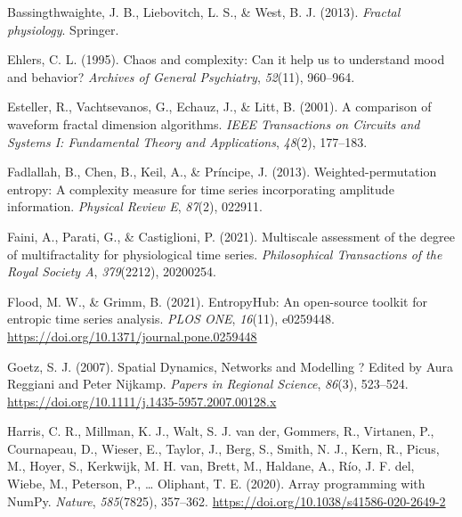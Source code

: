 \documentclass[
  man]{apa6}
\newlength{\cslhangindent}
\newlength{\cslentryspacingunit} %
\newenvironment{CSLReferences}[2] %
 {%
  \setlength{\parindent}{0pt}
  \ifodd #1
  \let\oldpar\par
  \def\par{\hangindent=\cslhangindent\oldpar}
  \fi
  \setlength{\parskip}{#2\cslentryspacingunit}
 }%
 {}
\begin{document}
\hypertarget{refs}{}
\begin{CSLReferences}{1}{0}
\leavevmode{}%
Bassingthwaighte, J. B., Liebovitch, L. S., \& West, B. J. (2013). \emph{Fractal physiology}. Springer.

\leavevmode{}%
Ehlers, C. L. (1995). Chaos and complexity: Can it help us to understand mood and behavior? \emph{Archives of General Psychiatry}, \emph{52}(11), 960--964.

\leavevmode{}%
Esteller, R., Vachtsevanos, G., Echauz, J., \& Litt, B. (2001). A comparison of waveform fractal dimension algorithms. \emph{IEEE Transactions on Circuits and Systems I: Fundamental Theory and Applications}, \emph{48}(2), 177--183.

\leavevmode{}%
Fadlallah, B., Chen, B., Keil, A., \& Príncipe, J. (2013). Weighted-permutation entropy: A complexity measure for time series incorporating amplitude information. \emph{Physical Review E}, \emph{87}(2), 022911.

\leavevmode{}%
Faini, A., Parati, G., \& Castiglioni, P. (2021). Multiscale assessment of the degree of multifractality for physiological time series. \emph{Philosophical Transactions of the Royal Society A}, \emph{379}(2212), 20200254.

\leavevmode{}%
Flood, M. W., \& Grimm, B. (2021). EntropyHub: An open-source toolkit for entropic time series analysis. \emph{PLOS ONE}, \emph{16}(11), e0259448. \url{https://doi.org/10.1371/journal.pone.0259448}

\leavevmode{}%
Goetz, S. J. (2007). Spatial Dynamics, Networks and Modelling ? Edited by Aura Reggiani and Peter Nijkamp. \emph{Papers in Regional Science}, \emph{86}(3), 523--524. \url{https://doi.org/10.1111/j.1435-5957.2007.00128.x}

\leavevmode{}%
Harris, C. R., Millman, K. J., Walt, S. J. van der, Gommers, R., Virtanen, P., Cournapeau, D., Wieser, E., Taylor, J., Berg, S., Smith, N. J., Kern, R., Picus, M., Hoyer, S., Kerkwijk, M. H. van, Brett, M., Haldane, A., Río, J. F. del, Wiebe, M., Peterson, P., \ldots{} Oliphant, T. E. (2020). Array programming with {NumPy}. \emph{Nature}, \emph{585}(7825), 357--362. \url{https://doi.org/10.1038/s41586-020-2649-2}


\end{CSLReferences}
\end{document}
